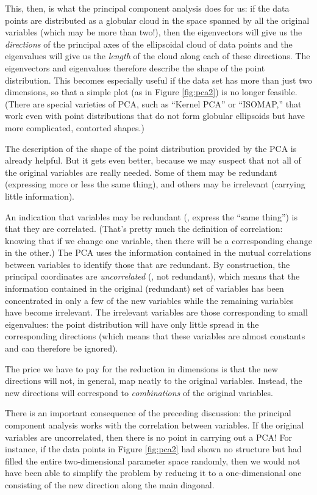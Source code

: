 This, then, is what the principal component analysis does for us: if
the data points are distributed as a globular cloud in the space
spanned by all the original variables (which may be more than two!),
then the eigenvectors will give us the \emph{directions} of the
principal axes of the ellipsoidal cloud of data points and the
eigenvalues will give us the \emph{length} of the cloud along each of
these directions. The eigenvectors and eigenvalues therefore describe
the shape of the point distribution. This becomes especially useful if
the data set has more than just two dimensions, so that a simple plot
(as in Figure \ref{fig:pca2}) is no longer feasible.  (There are
special varieties of PCA, such as ``Kernel PCA'' or ``ISOMAP,'' that
work even with point distributions that do not form globular
ellipsoids but have more complicated, contorted shapes.)

The description of the shape of the point distribution provided by the
PCA is already helpful. But it gets even\vadjust{\pagebreak} better, because we may
suspect that not all of the original variables are really needed. Some
of them may be redundant (expressing more or less the same thing), and
others may be irrelevant (carrying little information).

An indication that variables may be redundant (\ie, express the ``same
thing'') is that they are correlated. (That's pretty much the
definition of correlation: knowing that if we change one variable,
then there will be a corresponding change in the other.)  The PCA uses
the information contained in the mutual correlations between variables
to identify those that are redundant. By construction, the principal
coordinates are \emph{uncorrelated} (\ie, not redundant), which means
that the information contained in the original (redundant) set of
variables has been concentrated in only a few of the new variables
while the remaining variables have become irrelevant.  The irrelevant
variables are those corresponding to small eigenvalues: the point
distribution will have only little spread in the corresponding
directions (which means that these variables are almost constants and
can therefore be ignored).

The price we have to pay for the reduction in dimensions is that the
new directions will not, in general, map neatly to the original
variables. Instead, the new directions will correspond to
\emph{combinations} of the original variables.

There is an important consequence of the preceding discussion: the
principal component analysis works with the correlation between
variables. If the original variables are uncorrelated, then there is
no point in carrying out a PCA! For instance, if the data points in
Figure \ref{fig:pca2} had shown no structure but had filled the
entire two-dimensional parameter space randomly, then we would not
have been able to simplify the problem by reducing it to a
one-dimensional one consisting of the new direction along the main
diagonal.

